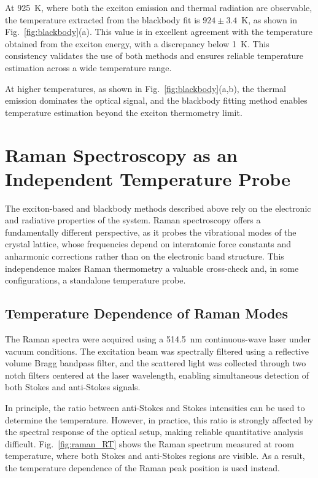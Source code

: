 At 925~K, where both the exciton emission and thermal radiation are observable, the temperature extracted from the blackbody fit is $924 \pm 3.4$~K, as shown in Fig.~\ref{fig:blackbody}(a). This value is in excellent agreement with the temperature obtained from the exciton energy, with a discrepancy below 1~K. This consistency validates the use of both methods and ensures reliable temperature estimation across a wide temperature range.

At higher temperatures, as shown in Fig.~\ref{fig:blackbody}(a,b), the thermal emission dominates the optical signal, and the blackbody fitting method enables temperature estimation beyond the exciton thermometry limit.




\section{Raman Spectroscopy as an Independent Temperature Probe}

The exciton-based and blackbody methods described above rely on the electronic and radiative properties of the system. Raman spectroscopy offers a fundamentally different perspective, as it probes the vibrational modes of the crystal lattice, whose frequencies depend on interatomic force constants and anharmonic corrections rather than on the electronic band structure. This independence makes Raman thermometry a valuable cross-check and, in some configurations, a standalone temperature probe.

\subsection{Temperature Dependence of Raman Modes}

The Raman spectra were acquired using a 514.5~nm continuous-wave laser under vacuum conditions. The excitation beam was spectrally filtered using a reflective volume Bragg bandpass filter, and the scattered light was collected through two notch filters centered at the laser wavelength, enabling simultaneous detection of both Stokes and anti-Stokes signals.

In principle, the ratio between anti-Stokes and Stokes intensities can be used to determine the temperature. However, in practice, this ratio is strongly affected by the spectral response of the optical setup, making reliable quantitative analysis difficult. Fig.~\ref{fig:raman_RT} shows the Raman spectrum measured at room temperature, where both Stokes and anti-Stokes regions are visible. As a result, the temperature dependence of the Raman peak position is used instead.

